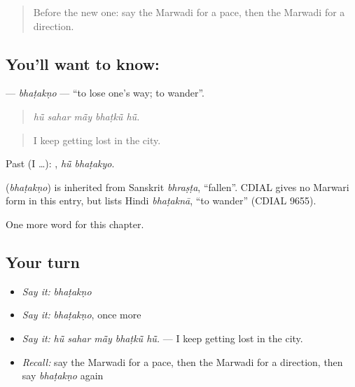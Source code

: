 \label{lesson:MW-C203-bhatakno}



\begin{quote}
Before the new one: say the Marwadi for a pace, then the Marwadi for a direction.
\end{quote}

\subsection*{You'll want to know: }
\textbf{} — \emph{bhaṭakṇo} — \textquotedblleft{}to lose one's way; to wander\textquotedblright{}.

\begin{quote}
    
\end{quote}

\begin{quote}
\emph{hū̃ sahar mā̃y bhaṭkū̃ hū̃.}
\end{quote}

\begin{quote}
I keep getting lost in the city.
\end{quote}

Past (I …):  , \emph{hū̃ bhaṭakyo}.

\begin{cousinweb}
\textbf{} (\emph{bhaṭakṇo}) is inherited from Sanskrit \emph{bhraṣṭa}, \textquotedblleft{}fallen\textquotedblright{}. CDIAL gives no Marwari form in this entry, but lists Hindi \emph{bhaṭaknā}, \textquotedblleft{}to wander\textquotedblright{} (CDIAL 9655).
\end{cousinweb}

\begin{grammarlens}[title={What you've built}]
One more word for this chapter.
\end{grammarlens}

\subsection*{Your turn}
\begin{itemize}
\raggedright
  \item \emph{Say it:} \emph{bhaṭakṇo}
  \item \emph{Say it:} \emph{bhaṭakṇo}, once more
  \item \emph{Say it:} \emph{hū̃ sahar mā̃y bhaṭkū̃ hū̃.} — I keep getting lost in the city.
  \item \emph{Recall:} say the Marwadi for a pace, then the Marwadi for a direction, then say \emph{bhaṭakṇo} again
\end{itemize}

